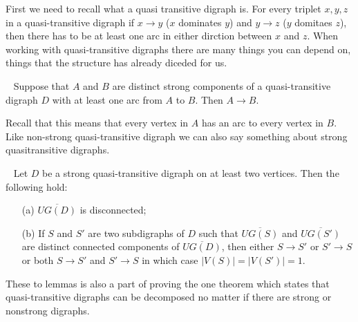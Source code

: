 First we need to recall what a quasi transitive digraph is. 
For every triplet $x,y,z$ in a quasi-transitive digraph if $x\rightarrow y$ ($x$ dominates $y$) and $y\rightarrow z$ ($y$ domitaes $z$), then there has to be at least one arc in either dirction between $x$ and $z$. 
When working with quasi-transitive digraphs there are many things you can depend on, things that the structure has already diceded for us.
\begin{lemma}~\cite{banggutin}
    Suppose that $A$ and $B$ are distinct strong components of a quasi-transitive digraph $D$ with at least one arc from $A$ to $B$. Then $A\rightarrow B$.
    \label{lemma:dominatingset}
\end{lemma}
Recall that this means that every vertex in $A$ has an arc to every vertex in $B$.
Like non-strong quasi-transitive digraph we can also say something about strong quasitransitive digraphs.
\begin{lemma}~\cite{banggutin,bangJGT2}
    Let $D$ be a strong quasi-transitive digraph on at least two vertices. Then the following hold:
    \begin{itemize}
        \item[(a)] $\overline{UG(D)}$ is disconnected;
        \item[(b)] If $S$ and $S'$ are two subdigraphs of $D$ such that $\overline{UG(S)}$ and $\overline{UG(S')}$ are distinct connected components of $\overline{UG(D)}$, then either $S\rightarrow S'$ or $S'\rightarrow S$ or both $S\rightarrow S'$ and $S'\rightarrow S$ in which case $|V(S)|=|V(S')|=1$. 
    \end{itemize} 
    \label{lemma:underlyinggraph}
\end{lemma}
These to lemmas is also a part of proving the one theorem which states that quasi-transitive digraphs can be decomposed no matter if there are strong or nonstrong digraphs. 

